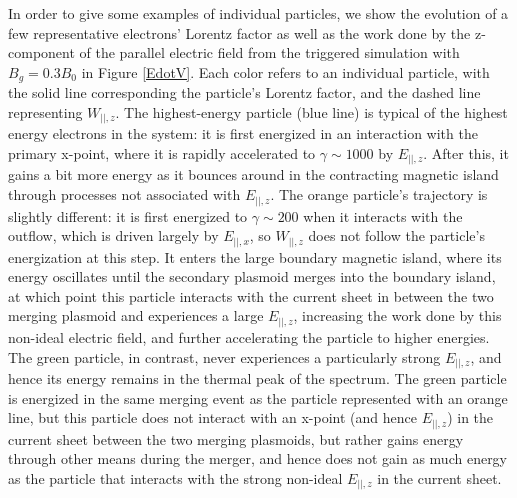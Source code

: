 \documentclass[iop,twocolappendix]{emulateapj}
\begin{document}
In order to give some examples of individual particles, we show the evolution of a few representative electrons' Lorentz factor as well as the work done by the z-component of the parallel electric field from the triggered simulation with $B_{g}=0.3B_{0}$ in Figure \ref{EdotV}.  Each color refers to an individual particle, with the solid line corresponding the particle's Lorentz factor, and the dashed line representing $W_{||,z}$.  The highest-energy particle (blue line) is typical of the highest energy electrons in the system: it is first energized in an interaction with the primary x-point, where it is rapidly accelerated to $\gamma \sim 1000$ by $E_{||,z}$.  After this, it gains a bit more energy as it bounces around in the contracting magnetic island through processes not associated with $E_{||,z}$.  The orange particle's trajectory is slightly different: it is first energized to $\gamma \sim 200$ when it interacts with the outflow, which is driven largely by $E_{||,x}$, so $W_{||,z}$ does not follow the particle's energization at this step.  It enters the large boundary magnetic island, where its energy oscillates until the secondary plasmoid merges into the boundary island, at which point this particle interacts with the current sheet in between the two merging plasmoid and experiences a large $E_{||,z}$, increasing the work done by this non-ideal electric field, and further accelerating the particle to higher energies.  The green particle, in contrast, never experiences a particularly strong $E_{||,z}$, and hence its energy remains in the thermal peak of the spectrum.  The green particle is energized in the same merging event as the particle represented with an orange line, but this particle does not interact with an x-point (and hence $E_{||,z}$) in the current sheet between the two merging plasmoids, but rather gains energy through other means during the merger, and hence does not gain as much energy as the particle that interacts with the strong non-ideal $E_{||,z}$ in the current sheet.
\end{document}
